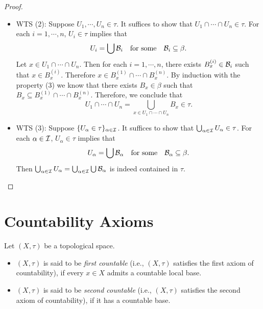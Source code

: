 \documentclass[screen]{techreport}
\numberwithin{equation}{section}
\begin{document}
\begin{proof}
\begin{itemize}
\begin{itemize}
			\item WTS (2):
			Suppose $U_1,\cdots,U_n \in \tau$.
			It suffices to show that $U_1 \cap \cdots \cap U_n \in \tau$.
			For each $i=1,\cdots,n$, $U_i \in \tau$ implies that
			\[
			U_i = \bigcup \mathcal{B}_i \quad \text{for some} \quad \mathcal{B}_i \subseteq \beta.
			\]
			Let $x \in U_1 \cap \cdots \cap U_n$.
			Then for each $i=1,\cdots,n$, there exists $B_x^{(i)} \in \mathcal{B}_i$ such that $x \in B_x^{(i)}$.
			Therefore $x \in B_x^{(1)} \cap \cdots \cap B_x^{(n)}$.
			By induction with the property (3) we know that there exists $B_x \in \beta$ such that $B_x \subseteq B_x^{(1)} \cap \cdots \cap B_x^{(n)}$.
			Therefore, we conclude that
			\[
			U_1 \cap \cdots \cap U_n = \bigcup_{x \in U_1 \cap \cdots \cap U_n} B_x \in \tau.
			\]
			
			\item WTS (3):
			Suppose $\{U_\alpha \in \tau\}_{\alpha \in \mathcal{I}}$.
			It suffices to show that $\bigcup_{\alpha \in \mathcal{I}} U_\alpha \in \tau$.
			For each $\alpha \in \mathcal{I}$, $U_\alpha \in \tau$ implies that
			\[
			U_\alpha = \bigcup \mathcal{B}_\alpha \quad \text{for some} \quad \mathcal{B}_\alpha \subseteq \beta.
			\]
			Then $\bigcup_{\alpha \in \mathcal{I}} U_\alpha = \bigcup_{\alpha \in \mathcal{I}} \bigcup \mathcal{B}_\alpha$ is indeed contained in $\tau$.
		\end{itemize}
	\end{itemize}
\end{proof}

\section{Countability Axioms}

\begin{definition}\label{De:AxiomsOfCountability}
	Let $(X,\tau)$ be a topological space.
	\begin{itemize}
		\item $(X,\tau)$ is said to be \emph{first countable} (i.e., $(X,\tau)$ satisfies the first axiom of countability), if every $x \in X$ admits a countable local base.
		\item $(X,\tau)$ is said to be \emph{second countable} (i.e., $(X,\tau)$ satisfies the second axiom of countability), if it has a countable base.
	\end{itemize}
\end{definition}
\end{document}
